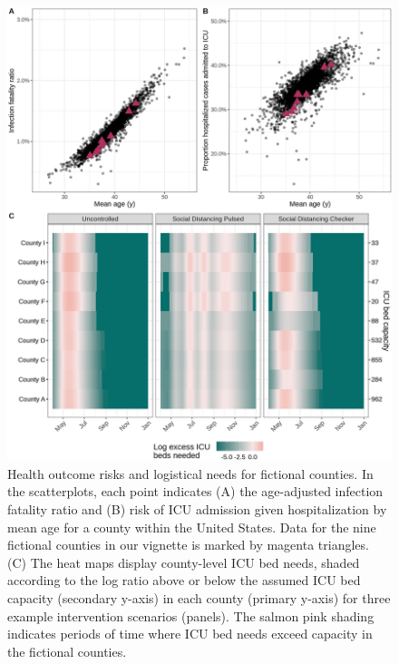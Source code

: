 {\begin{figure}[!htb]%
    \centering
    \includegraphics{fig_pipeline/fig3a}
    \caption[Health outcome risks and logistical needs for fictional counties.]{Health outcome risks and logistical needs for fictional counties. In the scatterplots, each point indicates (A) the age-adjusted infection fatality ratio and (B) risk of ICU admission given hospitalization by mean age for a county within the United States. Data for the nine fictional counties in our vignette is marked by magenta triangles. (C) The heat maps display county-level ICU bed needs, shaded according to the log ratio above or below the assumed ICU bed capacity (secondary y-axis) in each county (primary y-axis) for three example intervention scenarios (panels). The salmon pink shading indicates periods of time where ICU bed needs exceed capacity in the fictional counties.}
    \label{fig:pipeline-outcome}
\end{figure}

}
